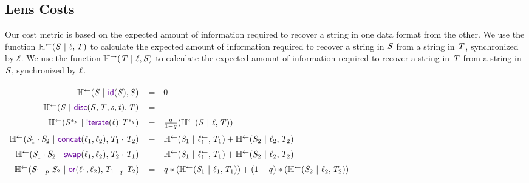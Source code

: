\documentclass[acmsmall,screen,anonymous]{acmart}
\begin{document}
\subsection{Lens Costs}
Our cost metric is based on the expected amount of information required to
recover a string in one data format from the other. We use the function
$\mathbb{H}^\leftarrow(\mathit{S} ~|~ \mathit{\ell}, \mathit{T})$ to calculate the expected amount
of information required to recover a string in $\mathit{S}$ from a string in
$\mathit{T}$, synchronized by $\mathit{\ell}$. We use the function
$\mathbb{H}^\rightarrow(\mathit{T} ~|~ \mathit{\ell}, \mathit{S})$ to calculate the expected amount
of information required to recover a string in $\mathit{T}$ from a string in
$\mathit{S}$, synchronized by $\mathit{\ell}$.
\begin{center}
  \begin{tabular}{rcl}
    $\LEntropyOf{\Regex \Given \IdentityLensOf{\Regex}, \Regex}$
    & =
    & 0\\
    
    $\LEntropyOf{\Regex \Given \DisconnectOf{\Regex}{\RegexAlt}{\String}{\StringAlt}, \RegexAlt}$
    & =
    & \EntropyOf{\Regex}\\

    $\LEntropyOf{\PRegexStar{\Regex}{\Probability} \Given \IterateLensOf{\Lens}^, \PRegexStar{\RegexAlt}{\ProbabilityAlt}}$
    & =
    & $\frac{q}{1-q}(\mathbb{H}^\leftarrow(\mathit{S} ~|~ \mathit{\ell}, \mathit{T}))$\\
    
    $\LEntropyOf{\Regex_1 \Concat \Regex_2 \Given \ConcatLensOf{\Lens_1}{\Lens_2}, \RegexAlt_1 \Concat \RegexAlt_2}$
    & =
    & $\mathbb{H}^\leftarrow(\mathit{S}_1 ~|~ \mathit{\ell}_1^\leftarrow, \mathit{T}_1) + \mathbb{H}^\leftarrow(\mathit{S}_2 ~|~ \mathit{\ell}_2, \mathit{T}_2)$\\
    
    $\LEntropyOf{\Regex_1 \Concat \Regex_2 \Given \SwapLensOf{\Lens_1}{\Lens_2}, \RegexAlt_2 \Concat \RegexAlt_1}$
    & =
    & $\mathbb{H}^\leftarrow(\mathit{S}_1 ~|~ \mathit{\ell}_1^\leftarrow, \mathit{T}_1) + \mathbb{H}^\leftarrow(\mathit{S}_2 ~|~ \mathit{\ell}_2, \mathit{T}_2)$\\
    
    $\LEntropyOf{\PRegexOr{\Regex_1}{\Regex_2}{\Probability} \Given \OrLensOf{\Lens_1}{\Lens_2}, \PRegexOr{\RegexAlt_1}{\RegexAlt_2}{\ProbabilityAlt}}$
    & =
    & $q*(\mathbb{H}^\leftarrow(\mathit{S}_1 ~|~ \mathit{\ell}_1, \mathit{T}_1)) + (1-q)*(\mathbb{H}^\leftarrow(\mathit{S}_2 ~|~ \mathit{\ell}_2, \mathit{T}_2))$\\
    

\end{tabular}
\end{center}
\end{document}
